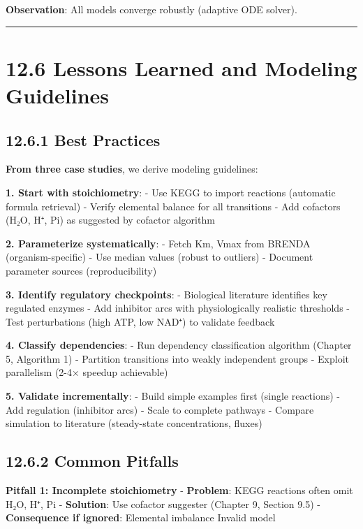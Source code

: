 \textbf{Observation}: All models converge robustly (adaptive ODE
solver).

\begin{center}\rule{0.5\linewidth}{0.5pt}\end{center}

\hypertarget{lessons-learned-and-modeling-guidelines}{%
\section{12.6 Lessons Learned and Modeling
Guidelines}\label{lessons-learned-and-modeling-guidelines}}

\hypertarget{best-practices}{%
\subsection{12.6.1 Best Practices}\label{best-practices}}

\textbf{From three case studies}, we derive modeling guidelines:

\textbf{1. Start with stoichiometry}: - Use KEGG to import reactions
(automatic formula retrieval) - Verify elemental balance for all
transitions - Add cofactors (H₂O, H⁺, Pi) as suggested by cofactor
algorithm

\textbf{2. Parameterize systematically}: - Fetch Km, Vmax from BRENDA
(organism-specific) - Use median values (robust to outliers) - Document
parameter sources (reproducibility)

\textbf{3. Identify regulatory checkpoints}: - Biological literature
identifies key regulated enzymes - Add inhibitor arcs with
physiologically realistic thresholds - Test perturbations (high ATP, low
NAD⁺) to validate feedback

\textbf{4. Classify dependencies}: - Run dependency classification
algorithm (Chapter 5, Algorithm 1) - Partition transitions into weakly
independent groups - Exploit parallelism (2-4× speedup achievable)

\textbf{5. Validate incrementally}: - Build simple examples first
(single reactions) - Add regulation (inhibitor arcs) - Scale to complete
pathways - Compare simulation to literature (steady-state
concentrations, fluxes)

\hypertarget{common-pitfalls}{%
\subsection{12.6.2 Common Pitfalls}\label{common-pitfalls}}

\textbf{Pitfall 1: Incomplete stoichiometry} - \textbf{Problem}: KEGG
reactions often omit H₂O, H⁺, Pi - \textbf{Solution}: Use cofactor
suggester (Chapter 9, Section 9.5) - \textbf{Consequence if ignored}:
Elemental imbalance \textrightarrow Invalid model

